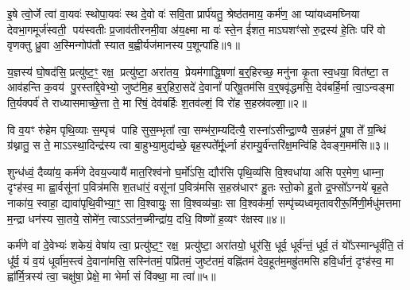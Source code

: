 

\setcounter{anuvakam}{0}
इ॒षे त्वो॒र्जे त्वा॑ वा॒यवः॑ स्थोपा॒यवः॑ स्थ दे॒वो वः॑ सवि॒ता प्रार्प॑यतु॒ श्रेष्ठ॑तमाय॒ कर्म॑ण॒ आ प्या॑यध्वमघ्निया देवभा॒गमूर्ज॑स्वती॒ पय॑स्वतीः प्र॒जाव॑तीरनमी॒वा अ॑य॒क्ष्मा मा वः॑ स्ते॒न ई॑शत॒ मा\-ऽघशꣳ॑सो रु॒द्रस्य॑ हे॒तिः परि॑ वो वृणक्तु ध्रु॒वा अ॒स्मिन्गोप॑तौ स्यात ब॒ह्वीर्यज॑मानस्य प॒शून्पा॑हि॥१॥

{\anuvakamend[{इ॒षे त्रिच॑त्वारिꣳशत्। (1)}]}

य॒ज्ञस्य॑ घो॒षद॑सि॒ प्रत्यु॑ष्ट॒ꣳ॒ रक्ष॒ प्रत्यु॑ष्टा॒ अरा॑तय॒ प्रेयम॑गाद्धि॒षणा॑ ब॒र्॒हिरच्छ॒ मनु॑ना कृ॒ता स्व॒धया॒ वित॑ष्टा॒ त आव॑हन्ति क॒वय॑ पु॒रस्ता᳚द्दे॒वेभ्यो॒ जुष्ट॑मि॒ह ब॒र्॒हिरा॒सदे॑ दे॒वानां᳚ परिषू॒तम॑सि व॒र्॒षवृ॑द्धमसि॒ देव॑बर्\mbox{}हि॒र्मा त्वा॒\-ऽन्वङ्मा ति॒र्यक्पर्व॑ ते राध्यासमाच्छे॒त्ता ते॒ मा रि॑षं॒ देव॑बर्\mbox{}हिः श॒तव॑ल्\mbox{}शं॒ वि रो॑ह स॒हस्र॑वल्\mbox{}शा॒॥२॥

वि व॒यꣳ रु॑हेम पृथि॒व्याः स॒म्पृच॑ पाहि सुस॒म्भृता᳚ त्वा॒ सम्भ॑रा॒म्यदि॑त्यै॒ रास्ना॑\-ऽसीन्द्रा॒ण्यै स॒न्नह॑नं पू॒षा ते᳚ ग्र॒न्थिं ग्र॑थ्नातु॒ स ते॒ मा\-ऽ\-ऽस्था॒दिन्द्र॑स्य त्वा बा॒हुभ्या॒मुद्य॑च्छे॒ बृह॒स्पते᳚र्मू॒र्ध्ना ह॑राम्यु॒र्व॑न्तरि॑क्ष॒मन्वि॑हि देवङ्ग॒मम॑सि॥३॥

{\anuvakamend[{स॒हस्र॑वल्\mbox{}शा अ॒ष्टात्रिꣳ॑शच्च। (2)}]}

शुन्ध॑ध्वं॒ दैव्या॑य॒ कर्म॑णे देवय॒ज्यायै॑ मात॒रिश्व॑नो घ॒र्मो॑\-ऽसि॒ द्यौर॑सि पृथि॒व्य॑सि वि॒श्वधा॑या असि पर॒मेण॒ धाम्ना॒ दृꣳह॑स्व॒ मा ह्वा॒र्वसू॑नां प॒वित्र॑मसि श॒तधा॑रं॒ वसू॑नां प॒वित्र॑मसि स॒हस्र॑धारꣳ हु॒तः स्तो॒को हु॒तो द्र॒फ्सो᳚\-ऽग्नये॑ बृह॒ते नाका॑य॒ स्वाहा॒ द्यावा॑पृथि॒वीभ्या॒ꣳ॒ सा वि॒श्वायुः॒ सा वि॒श्वव्य॑चाः॒ सा वि॒श्वक॑र्मा॒ सम्पृ॑च्यध्वमृतावरीरू॒र्मिणी॒र्मधु॑मत्तमा म॒न्द्रा धन॑स्य सा॒तये॒ सोमे॑न॒ त्वा\-ऽ\-ऽत॑न॒च्मीन्द्रा॑य॒ दधि॒ विष्णो॑ ह॒व्यꣳ र॑क्षस्व॥४॥

{\anuvakamend[{सोमे॑ना॒ष्टौ च॑। (3)}]}

कर्म॑णे वां दे॒वेभ्यः॑ शकेयं॒ वेषा॑य त्वा॒ प्रत्यु॑ष्ट॒ꣳ॒ रक्ष॒ प्रत्यु॑ष्टा॒ अरा॑तयो॒ धूर॑सि॒ धूर्व॒ धूर्व॑न्तं॒ धूर्व॒ तं यो᳚\-ऽस्मान्धूर्व॑ति॒ तं धू᳚र्व॒ यं व॒यं धूर्वा॑म॒स्त्वं दे॒वाना॑मसि॒ सस्नि॑तमं॒ पप्रि॑तमं॒ जुष्ट॑तमं॒ वह्नि॑तमं देव॒हूत॑म॒मह्रु॑तमसि हवि॒र्धानं॒ दृꣳह॑स्व॒ मा ह्वा᳚र्मि॒त्रस्य॑ त्वा॒ चक्षु॑षा॒ प्रेक्षे॒ मा भेर्मा सं वि॑क्था॒ मा त्वा॑॥५॥

